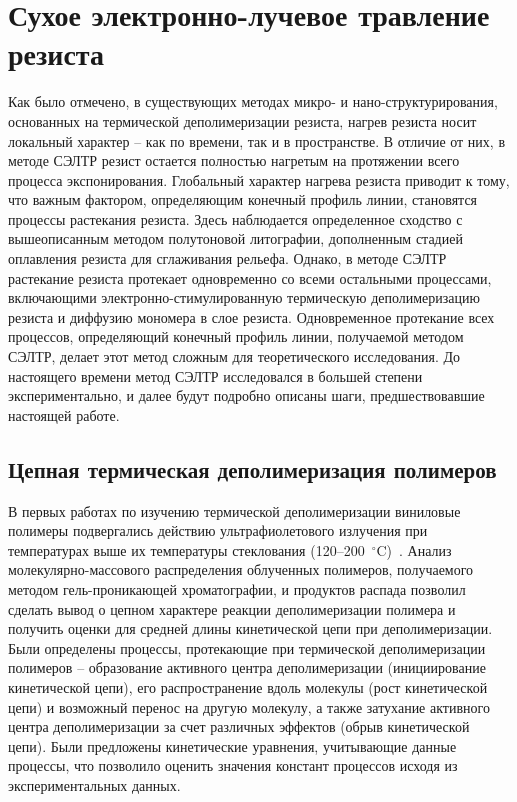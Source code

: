 \section{Сухое электронно-лучевое травление резиста}

Как было отмечено, в существующих методах микро- и нано-структурирования, основанных на термической деполимеризации резиста, нагрев резиста носит локальный характер -- как по времени, так и в пространстве. В отличие от них, в методе СЭЛТР резист остается полностью нагретым на протяжении всего процесса экспонирования. Глобальный характер нагрева резиста приводит к тому, что важным фактором, определяющим конечный профиль линии, становятся процессы растекания резиста. Здесь наблюдается определенное сходство с вышеописанным методом полутоновой литографии, дополненным стадией оплавления резиста для сглаживания рельефа. Однако, в методе СЭЛТР растекание резиста протекает одновременно со всеми остальными процессами, включающими электронно-стимулированную термическую деполимеризацию резиста и диффузию мономера в слое резиста. Одновременное протекание всех процессов, определяющий конечный профиль линии, получаемой методом СЭЛТР, делает этот метод сложным для теоретического исследования. До настоящего времени метод СЭЛТР исследовался в большей степени экспериментально, и далее будут подробно описаны шаги, предшествовавшие настоящей работе.


\subsection{Цепная термическая деполимеризация полимеров}
В первых работах по изучению термической деполимеризации виниловые полимеры подвергались действию ультрафиолетового излучения при температурах выше их температуры стеклования (120--200~$^\circ$C)~\cite{Cowley_1952_1, Cowley_1952_2, Grassie1949_1, Grassie1949_2, Grassie1949_3, Grassie1949_4}.
Анализ молекулярно-массового распределения облученных полимеров, получаемого методом гель-проникающей хроматографии, и продуктов распада позволил сделать вывод о цепном характере реакции деполимеризации полимера и получить оценки для средней длины кинетической цепи при деполимеризации.
Были определены процессы, протекающие при термической деполимеризации полимеров -- образование активного центра деполимеризации (инициирование кинетической цепи), его распространение вдоль молекулы (рост кинетической цепи) и возможный перенос на другую молекулу, а также затухание активного центра деполимеризации за счет различных эффектов (обрыв кинетической цепи).
Были предложены кинетические уравнения, учитывающие данные процессы, что позволило оценить значения констант процессов исходя из экспериментальных данных.

